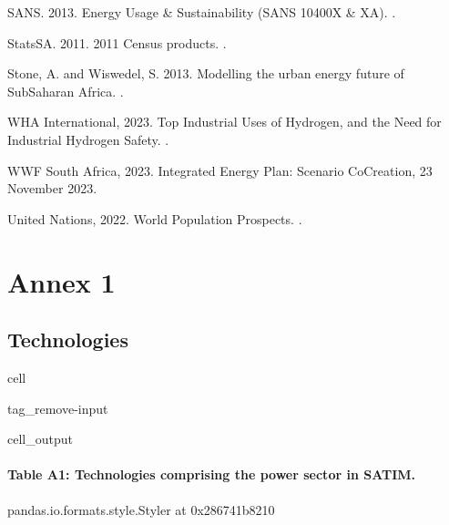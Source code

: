 \documentclass[letterpaper,10pt,english]{jupyterBook}
\begin{document}
\sphinxAtStartPar
SANS. 2013. Energy Usage \& Sustainability (SANS 10400X \& XA). .

\sphinxAtStartPar
StatsSA. 2011. 2011 Census products. .

\sphinxAtStartPar
Stone, A. and Wiswedel, S. 2013. Modelling the urban energy future of Sub\sphinxhyphen{}Saharan Africa. .

\sphinxAtStartPar
WHA International, 2023. Top Industrial Uses of Hydrogen, and the Need for Industrial Hydrogen Safety. .

\sphinxAtStartPar
WWF South Africa, 2023. Integrated Energy Plan: Scenario Co\sphinxhyphen{}Creation, 23 November 2023.

\sphinxAtStartPar
United Nations, 2022. World Population Prospects. .

\sphinxstepscope


\chapter{Annex 1}
\label{\detokenize{Annex 1 Techs:annex-1}}\label{\detokenize{Annex 1 Techs::doc}}

\section{Technologies}
\label{\detokenize{Annex 1 Techs:technologies}}
\begin{sphinxuseclass}{cell}
\begin{sphinxuseclass}{tag_remove-input}\begin{sphinxVerbatimOutput}

\begin{sphinxuseclass}{cell_output}\subsubsection*{Table A1: Technologies comprising the power sector in SATIM.}

\begin{sphinxVerbatim}[commandchars=\\\{\}]
\PYGZlt{}pandas.io.formats.style.Styler at 0x286741b8210\PYGZgt{}
\end{sphinxVerbatim}

\end{sphinxuseclass}\end{sphinxVerbatimOutput}

\end{sphinxuseclass}
\end{sphinxuseclass}
\end{document}
